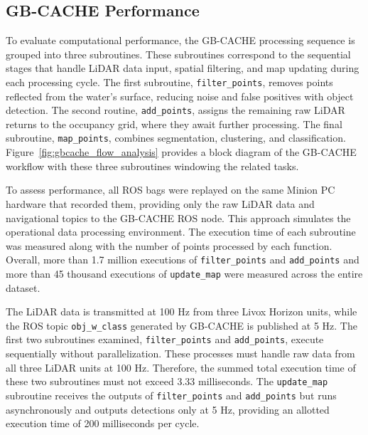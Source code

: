 \documentclass{erauthesis}
\begin{document}

\subsection{GB-CACHE Performance} \label{sec:gbcache_results}

To evaluate computational performance, the GB-CACHE processing sequence is grouped into three subroutines.
These subroutines correspond to the sequential stages that handle LiDAR data input, spatial filtering, and map updating during each processing cycle.
The first subroutine, \texttt{filter\_points}, removes points reflected from the water's surface, reducing noise and false positives with object detection.
The second routine, \texttt{add\_points}, assigns the remaining raw LiDAR returns to the occupancy grid, where they await further processing.
The final subroutine, \texttt{map\_points}, combines segmentation, clustering, and classification.
Figure~\ref{fig:gbcache_flow_analysis} provides a block diagram of the GB-CACHE workflow with these three subroutines windowing the related tasks.

To assess performance, all ROS bags were replayed on the same Minion PC hardware that recorded them, providing only the raw LiDAR data and navigational topics to the GB-CACHE ROS node. 
This approach simulates the operational data processing environment. 
The execution time of each subroutine was measured along with the number of points processed by each function. 
Overall, more than 1.7 million executions of \texttt{filter\_points} and \texttt{add\_points} and more than 45 thousand executions of \texttt{update\_map} were measured across the entire dataset.

The LiDAR data is transmitted at 100 Hz from three Livox Horizon units, while the ROS topic \texttt{obj\_w\_class} generated by GB-CACHE is published at 5 Hz. 
The first two subroutines examined, \texttt{filter\_points} and \texttt{add\_points}, execute sequentially without parallelization. 
These processes must handle raw data from all three LiDAR units at 100 Hz.
Therefore, the summed total execution time of these two subroutines must not exceed 3.33 milliseconds.
The \texttt{update\_map} subroutine receives the outputs of \texttt{filter\_points} and \texttt{add\_points} but runs asynchronously and outputs detections only at 5 Hz, providing an allotted execution time of 200 milliseconds per cycle.
\end{document}
